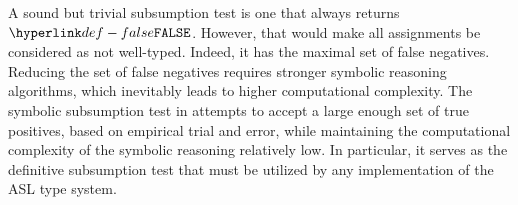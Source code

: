 A sound but trivial subsumption test is one that always returns $\False$.
However, that would make all assignments be considered as not well-typed.
Indeed, it has the maximal set of false negatives.
Reducing the set of false negatives requires stronger symbolic reasoning algorithms,
which inevitably leads to higher computational complexity.
%
The symbolic subsumption test in 
attempts to accept a large enough set of true positives, based on empirical trial and error,
while maintaining the computational complexity of the symbolic reasoning relatively low.
%
In particular, it serves as the definitive subsumption test that must be utilized
by any implementation of the ASL type system.
